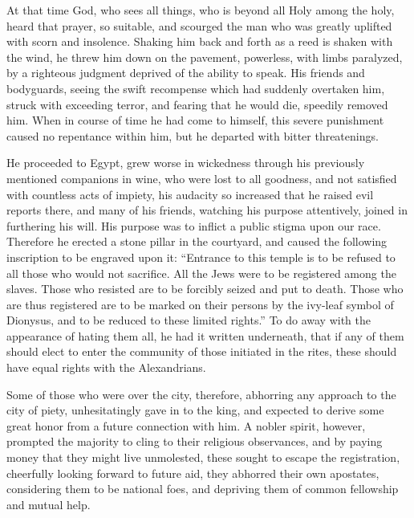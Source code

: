  At that time God, who sees all things, who is beyond all
Holy among the holy, heard that prayer, so suitable, and scourged the
man who was greatly uplifted with scorn and insolence. 
Shaking him back and forth as a reed is shaken with the wind, he threw
him down on the pavement, powerless, with limbs paralyzed, by a
righteous judgment deprived of the ability to speak.  His
friends and bodyguards, seeing the swift recompense which had suddenly
overtaken him, struck with exceeding terror, and fearing that he would
die, speedily removed him.  When in course of time he had
come to himself, this severe punishment caused no repentance within him,
but he departed with bitter threatenings.

 He proceeded to Egypt, grew worse in wickedness through
his previously mentioned companions in wine, who were lost to all
goodness,  and not satisfied with countless acts of
impiety, his audacity so increased that he raised evil reports there,
and many of his friends, watching his purpose attentively, joined in
furthering his will.  His purpose was to inflict a public
stigma upon our race. Therefore he erected a stone pillar in the
courtyard, and caused the following inscription to be engraved upon it:
 ``Entrance to this temple is to be refused to all those
who would not sacrifice. All the Jews were to be registered among the
slaves. Those who resisted are to be forcibly seized and put to death.
 Those who are thus registered are to be marked on their
persons by the ivy-leaf symbol of Dionysus, and to be reduced to these
limited rights.''  To do away with the appearance of
hating them all, he had it written underneath, that if any of them
should elect to enter the community of those initiated in the rites,
these should have equal rights with the Alexandrians.

 Some of those who were over the city, therefore,
abhorring any approach to the city of piety, unhesitatingly gave in to
the king, and expected to derive some great honor from a future
connection with him.  A nobler spirit, however, prompted
the majority to cling to their religious observances, and by paying
money that they might live unmolested, these sought to escape the
registration,  cheerfully looking forward to future aid,
they abhorred their own apostates, considering them to be national foes,
and depriving them of common fellowship and mutual help.

